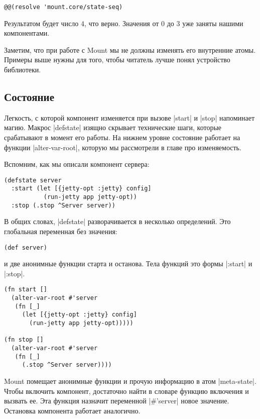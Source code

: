 \begin{verbatim}
@@(resolve 'mount.core/state-seq)
\end{verbatim}

Результатом будет число 4, что верно. Значения от 0 до 3 уже заняты нашими
компонентами.

Заметим, что при работе с Mount мы не должны изменять его внутренние
атомы. Примеры выше нужны для того, чтобы читатель лучше понял устройство
библиотеки.

\subsection{Состояние}

Легкость, с которой компонент изменяется при вызове \spverb|start| и \spverb|stop| напоминает
магию. Макрос \spverb|defstate| изящно скрывает технические шаги, которые срабатывают в
момент его работы. На нижнем уровне состояние работает на функции
\spverb|alter-var-root|, которую мы рассмотрели в главе про изменяемость.

Вспомним, как мы описали компонент сервера:

\begin{verbatim}
(defstate server
  :start (let [{jetty-opt :jetty} config]
           (run-jetty app jetty-opt))
  :stop (.stop ^Server server))
\end{verbatim}

В общих словах, \spverb|defstate| разворачивается в несколько определений. Это
глобальная переменная без значения:

\begin{verbatim}
(def server)
\end{verbatim}

и две анонимные функции старта и останова. Тела функций это формы \spverb|:start| и
\spverb|:stop|.

\begin{verbatim}
(fn start []
  (alter-var-root #'server
   (fn [_]
     (let [{jetty-opt :jetty} config]
       (run-jetty app jetty-opt)))))

(fn stop []
  (alter-var-root #'server
   (fn [_]
     (.stop ^Server server))))
\end{verbatim}

Mount помещает анонимные функции и прочую информацию в атом \spverb|meta-state|. Чтобы
включить компонент, достаточно найти в словаре функцию включения и вызвать
ее. Эта функция назначит переменной \spverb|#'server| новое значение. Остановка
компонента работает аналогично.

